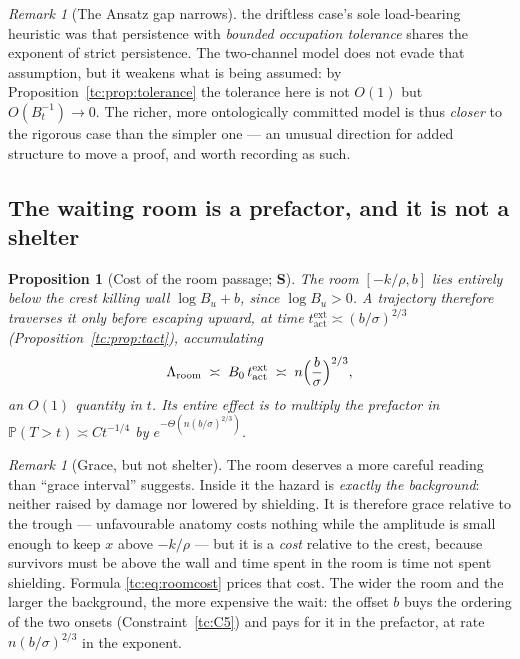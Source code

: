 \documentclass[11pt]{article}
\numberwithin{equation}{section}
\theoremstyle{plain}
\newtheorem{proposition}[theorem]{Proposition}
\theoremstyle{definition}
\theoremstyle{remark}
\newtheorem{remark}[theorem]{Remark}
\newcommand{\PP}{\mathbb{P}}
\begin{document}
\begin{remark}[The Ansatz gap narrows]\label{tc:rem:gapnarrows}
the driftless case's sole load-bearing heuristic was that persistence with
\emph{bounded occupation tolerance} shares the exponent of strict
persistence. The two-channel model does not evade that assumption, but
it weakens what is being assumed: by
Proposition~\ref{tc:prop:tolerance} the tolerance here is not $O(1)$ but
$O(B_t^{-1})\to0$. The richer, more ontologically committed model is
thus \emph{closer} to the rigorous case than the simpler one --- an
unusual direction for added structure to move a proof, and worth
recording as such.
\end{remark}

\subsection{The waiting room is a prefactor, and it is not a
shelter}\label{tc:subsub:roomcost}

\begin{proposition}[Cost of the room passage; \textbf{S}]
\label{tc:prop:roomcost}
The room $[-k/\rho,b]$ lies entirely below the crest killing wall
$\log B_u+b$, since $\log B_u>0$. A trajectory therefore traverses it
only before escaping upward, at time
$t^{\mathrm{ext}}_{\mathrm{act}}\asymp(b/\sigma)^{2/3}$
(Proposition~\ref{tc:prop:tact}), accumulating
\begin{equation}\label{tc:eq:roomcost}
\Lambda_{\mathrm{room}}\;\asymp\;
B_0\,t^{\mathrm{ext}}_{\mathrm{act}}
\;\asymp\;n\Bigl(\frac{b}{\sigma}\Bigr)^{2/3},
\end{equation}
an $O(1)$ quantity in $t$. Its entire effect is to multiply the
prefactor in $\PP(T>t)\asymp Ct^{-1/4}$ by
$e^{-\Theta\left(n(b/\sigma)^{2/3}\right)}$.
\end{proposition}

\begin{remark}[Grace, but not shelter]\label{tc:rem:notshelter}
The room deserves a more careful reading than ``grace interval''
suggests. Inside it the hazard is \emph{exactly the background}: neither
raised by damage nor lowered by shielding. It is therefore grace
relative to the trough --- unfavourable anatomy costs nothing while the
amplitude is small enough to keep $x$ above $-k/\rho$ --- but it is a
\emph{cost} relative to the crest, because survivors must be above the
wall and time spent in the room is time not spent shielding. Formula
\eqref{tc:eq:roomcost} prices that cost. The wider the room and the
larger the background, the more expensive the wait: the offset $b$ buys
the ordering of the two onsets (Constraint~\ref{tc:C5}) and pays for it
in the prefactor, at rate $n(b/\sigma)^{2/3}$ in the exponent.
\end{remark}
\end{document}
